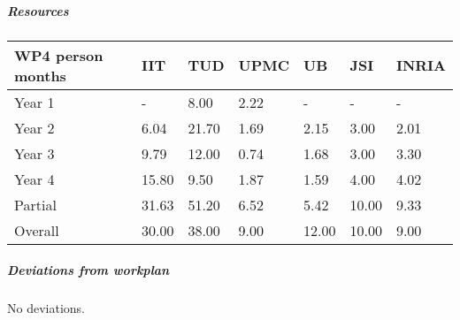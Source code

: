 
\subparagraph*{Resources}

\begin{center}
\begin{tabular}{|C{1.5cm}|C{1.5cm}|C{1.5cm}|C{2cm}|C{2cm}|C{2cm}|C{2cm}|}
\hline
\footnotesize \textbf{WP4 person months}& \footnotesize \textbf{IIT}&\footnotesize \textbf{TUD}&\footnotesize \textbf{UPMC}& \footnotesize \textbf{UB} &\footnotesize \textbf{JSI} &\footnotesize \textbf{INRIA}\\ \hline
\footnotesize Year 1  &  -        & 8.00   & 2.22 & -       & -        & -     \\  \hline
\footnotesize Year 2  &  6.04  & 21.70 & 1.69 & 2.15 & 3.00   & 2.01     \\  \hline
\footnotesize Year 3  &  9.79  & 12.00 & 0.74 & 1.68 & 3.00   & 3.30 \\  \hline
\footnotesize Year 4  & 15.80 &  9.50 &  1.87 &  1.59  &  4.00  &  4.02    \\  \hline
\footnotesize Partial  & 31.63 &  51.20 &  6.52 &  5.42 &  10.00 &  9.33    \\
\hline \hline
\footnotesize Overall & 30.00 & 38.00 & 9.00 & 12.00&10.00 & 9.00 \\ \hline
\end{tabular}
\end{center}

\subparagraph*{Deviations from workplan} 

No deviations.

